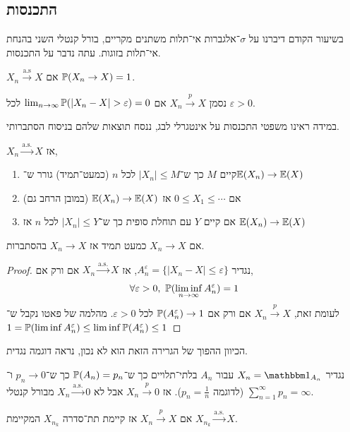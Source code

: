 \subsection{התכנסות}
בשיעור הקודם דיברנו על $\sigma$־אלגברות אי־תלות משתנים מקריים, בורל קנטלי השני בהנחת אי־תלות בזוגות.
עתה נדבר על התכנסות.
\begin{definition}
	$X_n \xrightarrow{\text{a.s}} X$ אם $\mathbb{P}(X_n \to X) = 1$.
\end{definition}
\begin{definition}
	נסמן $X_n \xrightarrow{p} X$ אם $\lim_{n \to \infty} \mathbb{P}(|X_n - X| > \varepsilon) = 0$ לכל $\varepsilon > 0$.
\end{definition}
במידה ראינו משפטי התכנסות על אינטגרלי לבג, ננסח תוצאות שלהם בניסוח הסתברותי.
\begin{theorem}
	$X_n \xrightarrow{\text{a.s.}} X$ אז,
	\begin{enumerate}
		\item קיים $M$ כך ש־$|X_n| \le M$ לכל $n$ (כמעט־תמיד) גורר ש־$\mathbb{E}(X_n) \to \mathbb{E}(X)$
		\item אם $0 \le X_1 \le \cdots$ אז $\mathbb{E}(X_n) \to \mathbb{E}(X)$ (במובן הרחב גם)
		\item אם קיים $Y$ עם תוחלת סופית כך ש־$|X_n| \le Y$ לכל $n$ אז $\mathbb{E}(X_n) \to \mathbb{E}(X)$
	\end{enumerate}
\end{theorem}
\begin{proposition}
	אם $X_n \to X$ כמעט תמיד אז $X_n \to X$ בהסתברות.
\end{proposition}
\begin{proof}
	נגדיר $A_n^\varepsilon = \{ |X_n - X| \le \varepsilon \}$, אז $X_n \xrightarrow{\text{a.s.}} X$ אם ורק אם,
	\[
		\forall \varepsilon > 0,\ \PP(\liminf_{n \to \infty} A_n^\varepsilon) = 1
	\]
	לעומת זאת, $X_n \xrightarrow{p} X$ אם ורק אם $\mathbb{P}(A_n^\varepsilon) \to 1$ לכל $\varepsilon > 0$.
	מהלמה של פאטו נקבל ש־$1 = \mathbb{P}(\liminf A_n^\varepsilon) \le \liminf \mathbb{P}(A_n^\varepsilon) \le 1$
\end{proof}
הכיוון ההפוך של הגרירה הזאת הוא לא נכון, נראה דוגמה נגדית.
\begin{example}
	נגדיר $X_n = \indicator_{A_n}$ עבור $A_n$ בלתי־תלויים כך ש־$\mathbb{P}(A_n) = p_n$ כך ש־$p_n \to 0$ ו־$\sum_{n = 1}^\infty p_n = \infty$ (לדוגמה $p_n = \frac{1}{n}$).
	אז $X_n \xrightarrow{p} 0$ אבל לא $X_n \xrightarrow{\text{a.s.}} 0$ מבורל קנטלי.
\end{example}
\begin{proposition}
	אם $X_n \xrightarrow{p} X$ אז קיימת תת־סדרה $X_{n_k}$ המקיימת $X_{n_k} \xrightarrow{\text{a.s.}} X$.
\end{proposition}
